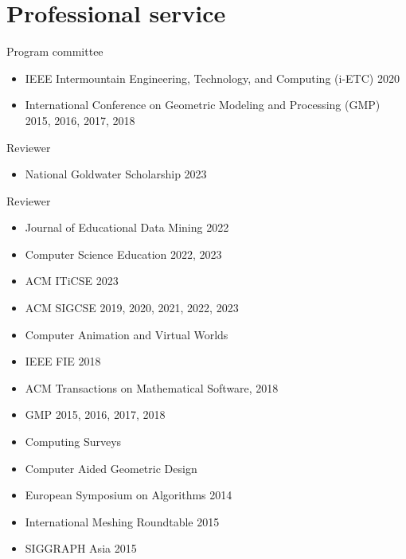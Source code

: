 \documentclass[margin,line]{res}
\begin{document}
\begin{resume}
\begin{LONG}
\end{LONG}

\section{\sc Professional service}
Program committee
\vspace{2mm}
\begin{itemize}[label={},leftmargin=5mm]
  \item IEEE Intermountain Engineering, Technology, and Computing (i-ETC) 2020
  \item International Conference on Geometric Modeling and Processing (GMP) 2015, 2016, 2017, 2018
\end{itemize}

Reviewer
\vspace{2mm}
\begin{itemize}[label={},leftmargin=5mm]
  \item National Goldwater Scholarship 2023
\end{itemize}

Reviewer
\vspace{2mm}
\begin{itemize}[label={},leftmargin=5mm]
  \item Journal of Educational Data Mining 2022
  \item Computer Science Education 2022, 2023
  \item ACM ITiCSE 2023
  \item ACM SIGCSE 2019, 2020, 2021, 2022, 2023
  \item Computer Animation and Virtual Worlds
  \item IEEE FIE 2018
  \item ACM Transactions on Mathematical Software, 2018
  \item GMP 2015, 2016, 2017, 2018
  \item Computing Surveys
  \item Computer Aided Geometric Design
  \item European Symposium on Algorithms 2014
  \item International Meshing Roundtable 2015
  \item SIGGRAPH Asia 2015
\end{itemize}


\end{resume}
\end{document}
